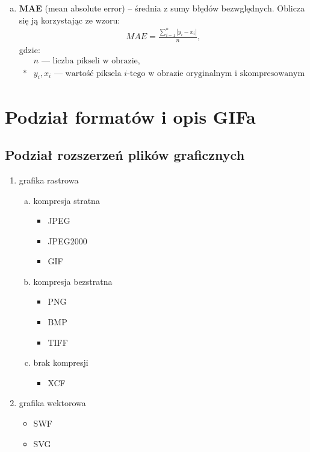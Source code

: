 \documentclass[a4paper, 12pt]{article}
\begin{document}
\begin{enumerate}[a)]
  \item \textbf {MAE} (mean absolute error) \--- średnia z sumy błędów bezwględnych. Oblicza się ją korzystając ze wzoru:
  \begin{equation*}
    \begin{aligned}
      MAE =\frac{\sum_{i=1}^{n}|y_i - x_i|}{n},
    \end{aligned}
  \end{equation*}
    gdzie:
  \begin{equation*}
    \begin{aligned}
      & n \textrm{\ --- liczba pikseli w obrazie,} \\*
      & y_i, x_i \textrm{\ --- wartość piksela } i \textrm{-tego w obrazie oryginalnym i skompresowanym}
    \end{aligned}
  \end{equation*}
 
\end{enumerate}
  
\section{Podział formatów i opis GIFa}

\subsection{Podział rozszerzeń plików graficznych}

\begin{enumerate}

  \item grafika rastrowa
 \begin{enumerate}[a)]

  \item kompresja stratna
\begin{itemize}
  \item JPEG
  \item JPEG2000
  \item GIF
\end{itemize}
  \item kompresja bezstratna
\begin{itemize}
  \item PNG
  \item BMP
  \item TIFF
\end{itemize}
  \item brak kompresji
 \begin{itemize}
  \item XCF
\end{itemize}
\end{enumerate}

  \item grafika wektorowa
 \begin{itemize}
  \item SWF
  \item SVG 
\end{itemize}

\end{enumerate}
\end{document}
